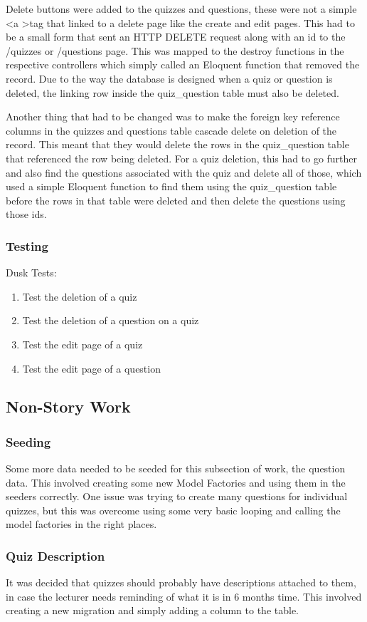 Delete buttons were added to the quizzes and questions, these were not a simple \textless a \textgreater tag that linked to a delete page like the create and edit pages. This had to be a small form that sent an HTTP DELETE request along with an id to the /quizzes or /questions page. This was mapped to the destroy functions in the respective controllers which simply called an Eloquent function that removed the record. Due to the way the database is designed when a quiz or question is deleted, the linking row inside the quiz\_question table must also be deleted. 

Another thing that had to be changed was to make the foreign key reference columns in the quizzes and questions table cascade delete on deletion of the record. This meant that they would delete the rows in the quiz\_question table that referenced the row being deleted. For a quiz deletion, this had to go further and also find the questions associated with the quiz and delete all of those, which used a simple Eloquent function to find them using the quiz\_question table before the rows in that table were deleted and then delete the questions using those ids. 
\subsubsection{Testing}
Dusk Tests:
\begin{enumerate}
	\item Test the deletion of a quiz
	\item Test the deletion of a question on a quiz
	\item Test the edit page of a quiz
	\item Test the edit page of a question
\end{enumerate}
\newpage

\subsection{Non-Story Work}
\subsubsection{Seeding}
Some more data needed to be seeded for this subsection of work, the question data. This involved creating some new Model Factories and using them in the seeders correctly. One issue was trying to create many questions for individual quizzes, but this was overcome using some very basic looping and calling the model factories in the right places.
\subsubsection{Quiz Description}
It was decided that quizzes should probably have descriptions attached to them, in case the lecturer needs reminding of what it is in 6 months time. This involved creating a new migration and simply adding a column to the table.
